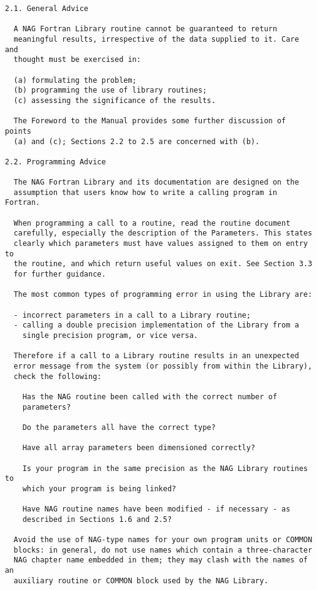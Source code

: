 \begin{verbatim}
2.1. General Advice
 
  A NAG Fortran Library routine cannot be guaranteed to return
  meaningful results, irrespective of the data supplied to it. Care and
  thought must be exercised in:
 
  (a) formulating the problem;
  (b) programming the use of library routines;
  (c) assessing the significance of the results.
 
  The Foreword to the Manual provides some further discussion of points
  (a) and (c); Sections 2.2 to 2.5 are concerned with (b).
 
2.2. Programming Advice
 
  The NAG Fortran Library and its documentation are designed on the
  assumption that users know how to write a calling program in Fortran.
 
  When programming a call to a routine, read the routine document
  carefully, especially the description of the Parameters. This states
  clearly which parameters must have values assigned to them on entry to
  the routine, and which return useful values on exit. See Section 3.3
  for further guidance.
 
  The most common types of programming error in using the Library are:
 
  - incorrect parameters in a call to a Library routine;
  - calling a double precision implementation of the Library from a
    single precision program, or vice versa.
 
  Therefore if a call to a Library routine results in an unexpected
  error message from the system (or possibly from within the Library),
  check the following:
 
    Has the NAG routine been called with the correct number of
    parameters?
 
    Do the parameters all have the correct type?
 
    Have all array parameters been dimensioned correctly?
 
    Is your program in the same precision as the NAG Library routines to
    which your program is being linked?
 
    Have NAG routine names have been modified - if necessary - as
    described in Sections 1.6 and 2.5?
 
  Avoid the use of NAG-type names for your own program units or COMMON
  blocks: in general, do not use names which contain a three-character
  NAG chapter name embedded in them; they may clash with the names of an
  auxiliary routine or COMMON block used by the NAG Library.
 

\end{verbatim}
